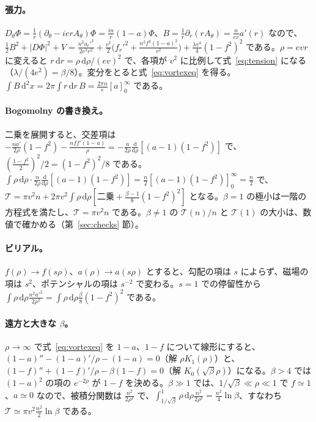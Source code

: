 \documentclass[a4paper,10pt]{ltjsarticle}
\newcommand{\dd}{\mathrm{d}}
\begin{document}
\paragraph{張力。}$D_\theta\Phi=\frac1r(\partial_\theta-ierA_\theta)\Phi=\frac{in}r(1-a)\Phi$、$B=\frac1r\partial_r(rA_\theta)=\frac n{er}a'(r)$ なので、$\frac12B^2+|D\Phi|^2+V=\frac{n^2a_r'^2}{2e^2r^2}+\frac{v^2}2\bigl(f_r'^2+\frac{n^2f^2(1-a)^2}{r^2}\bigr)+\frac{\lambda v^4}4(1-f^2)^2$ である。$\rho=evr$ に変えると $r\,\dd r=\rho\,\dd\rho/(ev)^2$ で、各項が $v^2$ に比例して式~\eqref{eq:tension} になる（$\lambda/(4e^2)=\beta/8$）。変分をとると式~\eqref{eq:vortexeq} を得る。$\int B\,\dd^2x=2\pi\int r\,\dd r\,B=\frac{2\pi n}e[a]_0^\infty$ である。

\paragraph{Bogomolny の書き換え。}二乗を展開すると、交差項は $-\frac{na'}{2\rho}(1-f^2)-\frac{nff'(1-a)}\rho=-\frac n{2\rho}\frac{\dd}{\dd\rho}[(a-1)(1-f^2)]$ で、$(\frac{1-f^2}2)^2/2=(1-f^2)^2/8$ である。$\int\rho\,\dd\rho\cdot\frac n{2\rho}\frac{\dd}{\dd\rho}[(a-1)(1-f^2)]=\frac n2[(a-1)(1-f^2)]_0^\infty=\frac n2$ で、$\mathcal T=\pi v^2n+2\pi v^2\int\rho\,\dd\rho[\text{二乗}+\frac{\beta-1}8(1-f^2)^2]$ となる。$\beta=1$ の極小は一階の方程式を満たし、$\mathcal T=\pi v^2n$ である。$\beta\ne1$ の $\mathcal T(n)/n$ と $\mathcal T(1)$ の大小は、数値で確かめる（第~\ref{sec:checks} 節）。

\paragraph{ビリアル。}$f(\rho)\to f(s\rho)$、$a(\rho)\to a(s\rho)$ とすると、勾配の項は $s$ によらず、磁場の項は $s^2$、ポテンシャルの項は $s^{-2}$ で変わる。$s=1$ での停留性から $\int\rho\,\dd\rho\frac{n^2a'^2}{2\rho^2}=\int\rho\,\dd\rho\frac\beta8(1-f^2)^2$ である。

\paragraph{遠方と大きな $\beta$。}$\rho\to\infty$ で式~\eqref{eq:vortexeq} を $1-a$、$1-f$ について線形にすると、$(1-a)''-(1-a)'/\rho-(1-a)=0$（解 $\rho K_1(\rho)$）と、$(1-f)''+(1-f)'/\rho-\beta(1-f)=0$（解 $K_0(\sqrt\beta\rho)$）になる。$\beta>4$ では $(1-a)^2$ の項の $e^{-2\rho}$ が $1-f$ を決める。$\beta\gg1$ では、$1/\sqrt\beta\ll\rho\ll1$ で $f\simeq1$、$a\simeq0$ なので、被積分関数は $\frac{n^2}{2\rho^2}$ で、$\int_{1/\sqrt\beta}^1\rho\,\dd\rho\frac{n^2}{2\rho^2}=\frac{n^2}4\ln\beta$、すなわち $\mathcal T\simeq\pi v^2\frac{n^2}2\ln\beta$ である。
\end{document}
